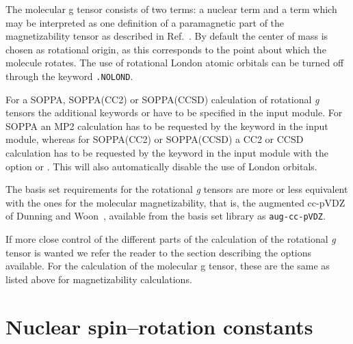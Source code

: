 The molecular g tensor consists of two terms: a nuclear term and a
term which may be interpreted as one definition of a paramagnetic part
of the magnetizability tensor as
described in Ref.~\cite{jgkrthjcp105}.
By default the center of mass is chosen as
rotational origin, as this corresponds to the point about which the
molecule rotates. The use of
rotational London atomic
orbitals can be turned off through
the keyword \verb|.NOLOND|.

For a SOPPA, SOPPA(CC2) or
SOPPA(CCSD) calculation of rotational  {\em g}
tensors the additional keywords  or  have
to be specified in the  input module. For SOPPA an MP2
calculation has to be requested by the keyword  in the
 input module, whereas for SOPPA(CC2) or
SOPPA(CCSD) a CC2 or CCSD calculation has to be requested by the
keyword  in the  input module with the  option
 or . This will also automatically disable
the use of London orbitals.


The basis set requirements for the rotational {\em g} tensors are more or
less equivalent with the ones for the molecular magnetizability,
that is, the augmented cc-pVDZ of Dunning and
Woon~\cite{thdjcp90,dewthdjcp98}, available from the basis set library
as \verb|aug-cc-pVDZ|.

If more close control of the different parts of the calculation of the
rotational {\em g}  tensor is wanted we refer the reader to the section
describing the options available. For the calculation of the molecular
g tensor, these are the same as listed above for magnetizability
calculations.

\section{Nuclear spin--rotation constants}\label{sec:spinrotasjon}

\begin{center}
\end{center}



